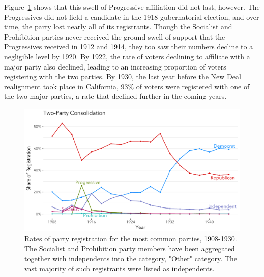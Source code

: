 \documentclass[11pt]{scrartcl}\usepackage[]{graphicx}\usepackage[]{color}
\makeatletter
\def\maxwidth{ %
  \ifdim\Gin@nat@width>\linewidth
    \linewidth
  \else
    \Gin@nat@width
  \fi
}
\newenvironment{knitrout}{}{} %
\makeatother
\begin{document}
Figure~\ref{fig:consolidation} shows that this swell of Progressive affiliation did not last, however.  The Progressives did not field a candidate in the 1918 gubernatorial election, and over time, the party lost nearly all of its registrants.  Though the Socialist and Prohibition parties never received the ground-swell of support that the Progressives received in 1912 and 1914, they too saw their numbers decline to a negligible level by 1920.  By 1922, the rate of voters declining to affiliate with a major party also declined, leading to an increasing proportion of voters registering with the two parties.  By 1930, the last year before the New Deal realignment took place in California, 93\% of voters were registered with one of the two major parties, a rate that declined further in the coming years.



\begin{knitrout}
\color{fgcolor}\begin{figure}

{\centering \includegraphics[width=\maxwidth]{figures/plots-consolidation-1} 

}

\caption[Rates of party registration for the most common parties, 1908-1930]{Rates of party registration for the most common parties, 1908-1930. The Socialist and Prohibition party members have been aggregated together with independents into the category, "Other" category. The vast majority of such registrants were listed as independents.}\label{fig:consolidation}
\end{figure}


\end{knitrout}
\end{document}
